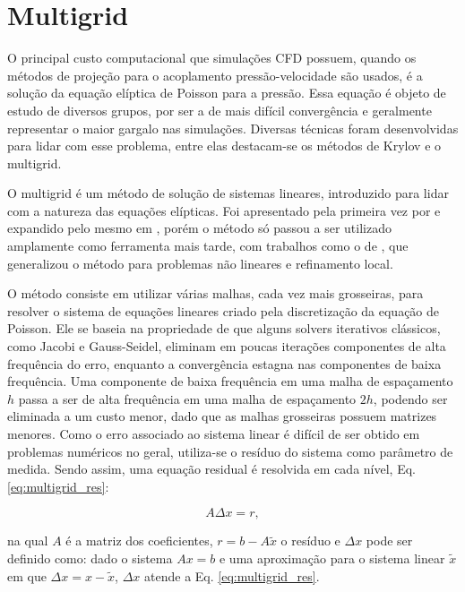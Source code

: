 \section{Multigrid}

O principal custo computacional que simulações CFD possuem, quando os métodos de projeção para o acoplamento pressão-velocidade são usados, é a solução da equação elíptica de Poisson para a pressão. Essa equação é objeto de estudo de diversos grupos, por ser a de mais difícil convergência e geralmente representar o maior gargalo nas simulações. Diversas técnicas foram desenvolvidas para lidar com esse problema, entre elas destacam-se os métodos de Krylov e o multigrid. 

O multigrid é um método de solução de sistemas lineares, introduzido para lidar com a natureza das equações elípticas. Foi apresentado pela primeira vez por \citet{Fedorenko1962} e expandido pelo mesmo em \citet{Fedorenko1964}, porém o método só passou a ser utilizado amplamente como ferramenta mais tarde, com trabalhos como o de \cite{Brandt1977}, que generalizou o método para problemas não lineares e refinamento local.

O método consiste em utilizar várias malhas, cada vez mais grosseiras, para resolver o sistema de equações lineares criado pela discretização da equação de Poisson. Ele se baseia na propriedade de que alguns solvers iterativos clássicos, como Jacobi e Gauss-Seidel, eliminam em poucas iterações componentes de alta frequência do erro, enquanto a convergência estagna nas componentes de baixa frequência. Uma componente de baixa frequência em uma malha de espaçamento $h$ passa a ser de alta frequência em uma malha de espaçamento $2h$, podendo ser eliminada a um custo menor, dado que as malhas grosseiras possuem matrizes menores. Como o erro associado ao sistema linear é difícil de ser obtido em problemas numéricos no geral, utiliza-se o resíduo do sistema como parâmetro de medida. Sendo assim, uma equação residual é resolvida em cada nível, Eq. \ref{eq:multigrid_res}:

\begin{equation}
    A\Delta x = r,
    \label{eq:multigrid_res}
\end{equation}

na qual $A$ é a matriz dos coeficientes, $r = b - A\tilde{x}$ o resíduo e $\Delta x$ pode ser definido como: dado o sistema $Ax = b$ e uma aproximação para o sistema linear $\tilde{x}$ em que $\Delta x = x - \tilde{x}$, $\Delta x$ atende a Eq. \ref{eq:multigrid_res}.

